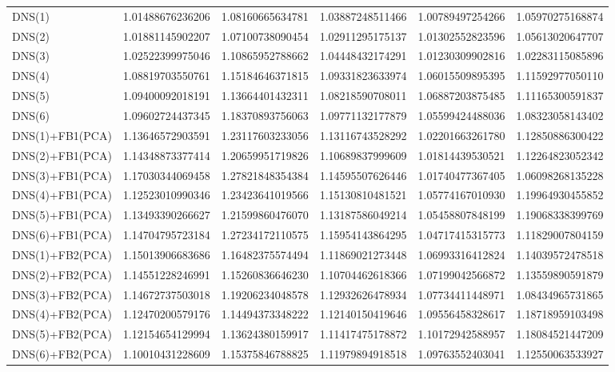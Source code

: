 \begin{table}[htb]
\begin{adjustbox}{totalheight=\baselineskip}
\begin{tabular}{lSSSSS}
DNS(1) & 1.01488676236206 & 1.08160665634781 & 1.03887248511466 & 1.00789497254266 & 1.05970275168874 \\ 
DNS(2) & 1.01881145902207 & 1.07100738090454 & 1.02911295175137 & 1.01302552823596 & 1.05613020647707 \\ 
DNS(3) & 1.02522399975046 & 1.10865952788662 & 1.04448432174291 & 1.01230309902816 & 1.02283115085896 \\ 
DNS(4) & 1.08819703550761 & 1.15184646371815 & 1.09331823633974 & 1.06015509895395 & 1.11592977050110 \\ 
DNS(5) & 1.09400092018191 & 1.13664401432311 & 1.08218590708011 & 1.06887203875485 & 1.11165300591837 \\ 
DNS(6) & 1.09602724437345 & 1.18370893756063 & 1.09771132177879 & 1.05599424488036 & 1.08323058143402 \\ 
DNS(1)+FB1(PCA) & 1.13646572903591 & 1.23117603233056 & 1.13116743528292 & 1.02201663261780 & 1.12850886300422 \\ 
DNS(2)+FB1(PCA) & 1.14348873377414 & 1.20659951719826 & 1.10689837999609 & 1.01814439530521 & 1.12264823052342 \\ 
DNS(3)+FB1(PCA) & 1.17030344069458 & 1.27821848354384 & 1.14595507626446 & 1.01740477367405 & 1.06098268135228 \\ 
DNS(4)+FB1(PCA) & 1.12523010990346 & 1.23423641019566 & 1.15130810481521 & 1.05774167010930 & 1.19964930455852 \\ 
DNS(5)+FB1(PCA) & 1.13493390266627 & 1.21599860476070 & 1.13187586049214 & 1.05458807848199 & 1.19068338399769 \\ 
DNS(6)+FB1(PCA) & 1.14704795723184 & 1.27234172110575 & 1.15954143864295 & 1.04717415315773 & 1.11829007804159 \\ 
DNS(1)+FB2(PCA) & 1.15013906683686 & 1.16482375574494 & 1.11869021273448 & 1.06993316412824 & 1.14039572478518 \\ 
DNS(2)+FB2(PCA) & 1.14551228246991 & 1.15260836646230 & 1.10704462618366 & 1.07199042566872 & 1.13559890591879 \\ 
DNS(3)+FB2(PCA) & 1.14672737503018 & 1.19206234048578 & 1.12932626478934 & 1.07734411448971 & 1.08434965731865 \\ 
DNS(4)+FB2(PCA) & 1.12470200579176 & 1.14494373348222 & 1.12140150419646 & 1.09556458328617 & 1.18718959103498 \\ 
DNS(5)+FB2(PCA) & 1.12154654129994 & 1.13624380159917 & 1.11417475178872 & 1.10172942588957 & 1.18084521447209 \\ 
DNS(6)+FB2(PCA) & 1.10010431228609 & 1.15375846788825 & 1.11979894918518 & 1.09763552403041 & 1.12550063533927 \\ 

\end{tabular}
\end{adjustbox}
\end{table}
